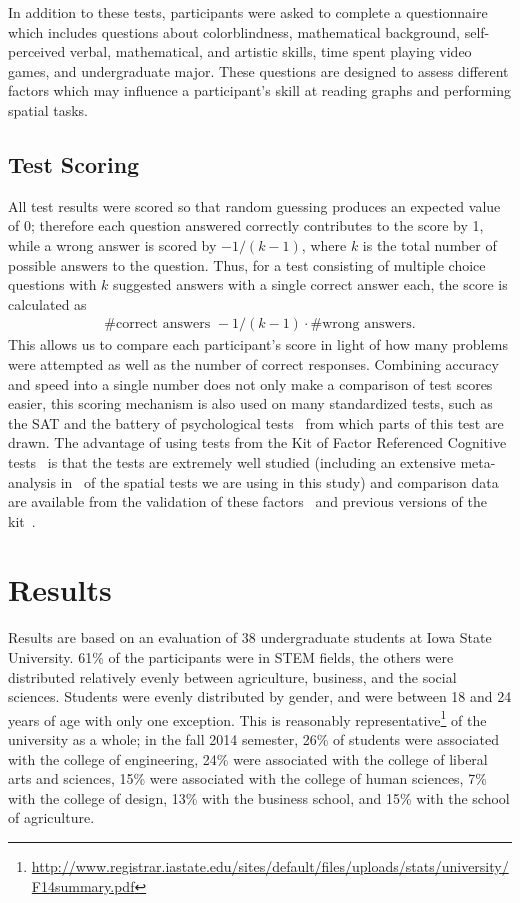 \documentclass[11pt]{isuthesis}\usepackage[]{graphicx}\usepackage[]{color}
\begin{document}
In addition to these tests, participants were asked to complete a questionnaire which includes questions about colorblindness, mathematical background, self-perceived verbal, mathematical, and artistic skills, time spent playing video games, and undergraduate major. 
These questions are designed to assess different factors which may influence a participant's skill at reading graphs and performing spatial tasks. 

\subsection{Test Scoring}\label{sec:scaling}

All test results were scored so that random guessing produces an expected value of 0; therefore each question answered correctly contributes to the score by 1, while a wrong answer is scored by $-1/(k-1)$, where $k$ is the total number of possible answers to the question. Thus, for a test consisting of multiple choice questions with $k$ suggested answers with a single correct answer each, the score is calculated as
\begin{eqnarray}\label{eq.scoring}
\# \text{correct answers } - 1/(k-1) \cdot \# \text{wrong answers}.
\end{eqnarray}
This allows us to compare each participant's score in light of how many problems were attempted as well as the number of correct responses. Combining accuracy and speed into a single number does not only make a comparison of test scores easier,  this scoring mechanism is also used on many standardized tests, such as the SAT and the battery of psychological tests~\citep{diamond1973correction, ekstrom1976manual} from which parts of this test are drawn. The advantage of using tests from the Kit of Factor Referenced Cognitive tests~\citep{ekstrom1976manual} is that the tests are extremely well studied (including an extensive meta-analysis in~\citep{voyer1995magnitude} of the spatial tests we are using in this study) and comparison data are available from the validation of these factors~\citep{schaie1998longitudinal,hampson1990variations,mayer1994whom} and previous versions of the kit~\citep{educational1963kit}.

\section{Results}\label{sec:results}
Results are based on an evaluation of 38 undergraduate students at Iowa State University. 61\% of the participants were in STEM fields, the others were distributed relatively evenly between agriculture, business, and the social sciences. Students were evenly distributed by gender, and were between 18 and 24 years of age with only one exception. This is reasonably representative\footnote{\url{http://www.registrar.iastate.edu/sites/default/files/uploads/stats/university/F14summary.pdf}} of the university as a whole; in the fall 2014 semester, 26\% of students were associated with the college of engineering, 24\% were associated with the college of liberal arts and sciences, 15\% were associated with the college of human sciences, 7\% with the college of design, 13\% with the business school, and 15\% with the school of agriculture.  
\end{document}
